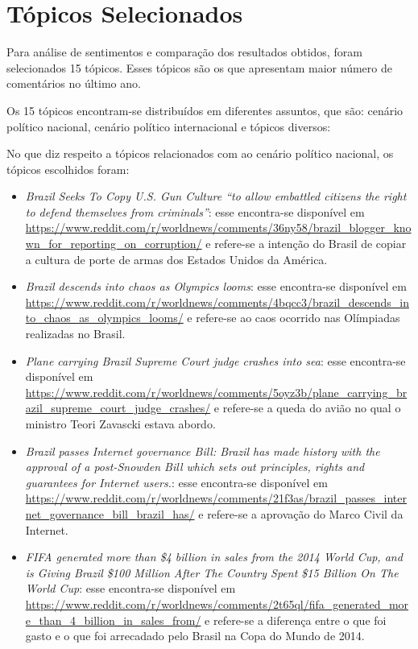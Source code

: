 \section{Tópicos Selecionados}

Para análise de sentimentos e comparação dos resultados obtidos, foram
selecionados 15 tópicos. Esses tópicos são os que apresentam maior número de
comentários no último ano.

Os 15 tópicos encontram-se distribuídos em diferentes assuntos, que são: cenário
político nacional, cenário político internacional e tópicos diversos:

No que diz respeito a tópicos relacionados com ao cenário político nacional, os
tópicos escolhidos foram:
\sloppy
\begin{itemize}
  \item
  \textit{Brazil Seeks To Copy U.S. Gun Culture ``to allow embattled
  citizens the right to defend themselves from
  criminals''}: esse encontra-se disponível em 
  \url{https://www.reddit.com/r/worldnews/comments/36ny58/brazil_blogger_known_for_reporting_on_corruption/}
  e refere-se a intenção do Brasil de copiar a cultura de porte de armas dos
  Estados Unidos da América.
  \item
  \textit{Brazil descends into chaos as Olympics looms}: esse encontra-se disponível em 
  \url{https://www.reddit.com/r/worldnews/comments/4bqcc3/brazil_descends_into_chaos_as_olympics_looms/}
  e refere-se ao caos ocorrido nas Olímpiadas realizadas no Brasil.
  \item
  \textit{Plane carrying Brazil Supreme Court judge crashes into sea}: esse encontra-se disponível em
  \url{https://www.reddit.com/r/worldnews/comments/5oyz3b/plane_carrying_brazil_supreme_court_judge_crashes/}
  e refere-se a queda do avião no qual o ministro Teori Zavascki estava abordo.
  \item
  \textit{Brazil passes Internet governance Bill: Brazil has made history with
  the approval of a post-Snowden Bill which sets out principles, rights and
  guarantees for Internet users.}: esse encontra-se disponível em
  \url{https://www.reddit.com/r/worldnews/comments/21f3as/brazil_passes_internet_governance_bill_brazil_has/}
  e refere-se a aprovação do Marco Civil da Internet.
  \item
  \textit{FIFA generated more than \$4 billion in sales from the 2014 World Cup,
  and is Giving Brazil \$100 Million After The Country Spent \$15 Billion On The
  World Cup}: esse encontra-se disponível em
  \url{https://www.reddit.com/r/worldnews/comments/2t65ql/fifa_generated_more_than_4_billion_in_sales_from/}
  e refere-se a diferença entre o que foi gasto e o que foi arrecadado pelo
  Brasil na Copa do Mundo de 2014.
 
\end{itemize}

